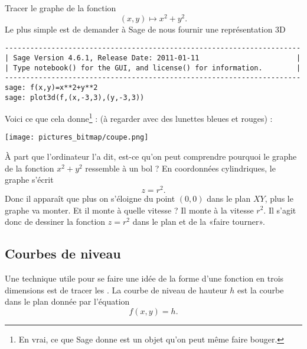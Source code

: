 \begin{example}     \label{ExempleTroisDxxyy}

	Tracer le graphe de la fonction
	\begin{equation}
		(x,y)\mapsto x^2+y^2.
	\end{equation}
	Le plus simple est de demander à Sage de nous fournir une représentation 3D
	\begin{verbatim}
----------------------------------------------------------------------
| Sage Version 4.6.1, Release Date: 2011-01-11                       |
| Type notebook() for the GUI, and license() for information.        |
----------------------------------------------------------------------
sage: f(x,y)=x**2+y**2
sage: plot3d(f,(x,-3,3),(y,-3,3))
    \end{verbatim}

	Voici ce que cela donne\footnote{En vrai, ce que Sage donne est un objet qu'on peut même faire bouger.} : (à regarder avec des lunettes bleues et rouges) :
	\begin{center}
		\texttt{[image: pictures\_bitmap/coupe.png]}
	\end{center}
	À part que l'ordinateur l'a dit, est-ce qu'on peut comprendre pourquoi le graphe de la fonction \( x^2+y^2\) ressemble à un bol ? En coordonnées cylindriques, le graphe s'écrit
	\begin{equation}
		z=r^2.
	\end{equation}
	Donc il apparaît que plus on s'éloigne du point \( (0,0)\) dans le plan \( XY\), plus le graphe va monter. Et il monte à quelle vitesse ? Il monte à la vitesse \( r^2\). Il s'agit donc de dessiner la fonction \( z=r^2\) dans le plan et de la «faire tourner».
\end{example}

\subsection{Courbes de niveau}

Une technique utile pour se faire une idée de la forme d'une fonction en trois dimensions est de tracer les . La courbe de niveau de hauteur \( h\) est la courbe dans le plan donnée par l'équation
\begin{equation}
	f(x,y)=h.
\end{equation}


